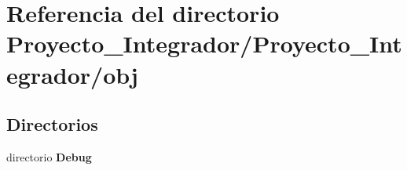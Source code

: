 \section{Referencia del directorio Proyecto\-\_\-\-Integrador/\-Proyecto\-\_\-\-Integrador/obj}
\label{dir_e2b326f36c9523b4e389fed27bd88cc2}
\subsection*{Directorios}
\begin{DoxyCompactItemize}
\item 
directorio {\bf Debug}
\end{DoxyCompactItemize}
